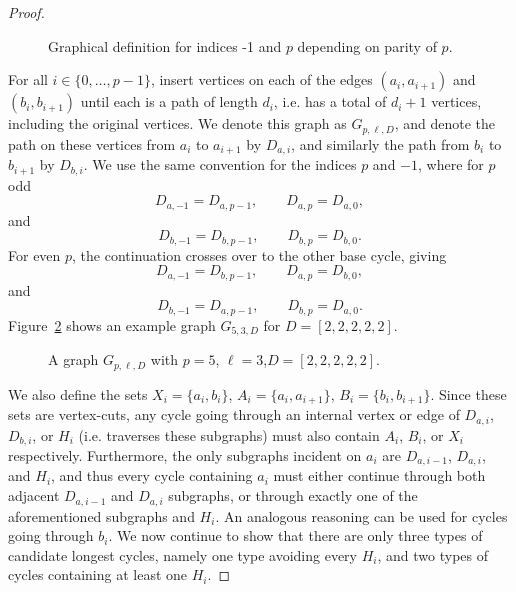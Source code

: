 \begin{proof}
\begin{figure}[ht]
    \caption{Graphical definition for indices -1 and $p$ depending on parity of $p$.}
    \label{fig:loop-around}
\end{figure}


For all $i \in \{0,\ldots,p-1\}$, insert vertices on each of the edges $(a_i,a_{i+1})$ and $(b_i,b_{i+1})$ until each is a path of length $d_i$, i.e. has a total of $d_i+1$ vertices, including the original vertices. We denote this graph as $G_{p,\ell,D}$, and denote the path on these vertices from $a_i$ to $a_{i+1}$ by $D_{a,i}$, and similarly the path from $b_i$ to $b_{i+1}$ by $D_{b,i}$. We use the same convention for the indices $p$ and $-1$, where for $p$ odd
\[
D_{a,-1}=D_{a,p-1}, \qquad D_{a,p}=D_{a,0},
\]
and
\[
D_{b,-1}=D_{b,p-1}, \qquad D_{b,p}=D_{b,0}.
\]
For even $p$, the continuation crosses over to the other base cycle, giving
\[
D_{a,-1}=D_{b,p-1}, \qquad D_{a,p}=D_{b,0},
\]
and
\[
D_{b,-1}=D_{a,p-1}, \qquad D_{b,p}=D_{a,0}.
\]
Figure~\ref{fig:g532} shows an example graph $G_{5,3,D}$ for $D=[2,2,2,2,2]$.

\begin{figure}
    \centering
    \caption{A graph $G_{p,\ell,D}$ with $p=5$, $\ell=3$,$D=[2,2,2,2,2]$.}
    \label{fig:g532}
\end{figure}


We also define the sets $X_i = \{a_i,b_i\}$, $A_i = \{a_i,a_{i+1}\}$, $B_i = \{b_i,b_{i+1}\}$. Since these sets are vertex-cuts, any cycle going through an internal vertex or edge of $D_{a,i}$, $D_{b,i}$, or $H_i$ (i.e. traverses these subgraphs) must also contain $A_i$, $B_i$, or $X_i$ respectively. Furthermore, the only subgraphs incident on $a_i$ are $D_{a,i-1}$, $D_{a,i}$, and $H_i$, and thus every cycle containing $a_i$ must either continue through both adjacent $D_{a,i-1}$ and $D_{a,i}$ subgraphs, or through exactly one of the aforementioned subgraphs and $H_i$. An analogous reasoning can be used for cycles going through $b_i$.
We now continue to show that there are only three types of candidate longest cycles, namely one type avoiding every $H_i$, and two types of cycles containing at least one $H_i$.


\end{proof}
